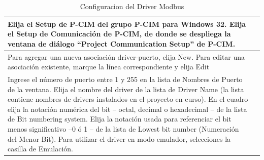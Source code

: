 \begin{itemize}
\begin{table}[H]
\centering
\renewcommand*{\arraystretch}{0.3}
\begin{tabular}{*{2}{m{}}}
\hline
  Elija el Setup de P-CIM del grupo P-CIM para Windows 32.
  Elija el Setup de Comunicación de P-CIM, de donde se despliega la ventana 
  de diálogo “Project Communication Setup” de P-CIM.
  &\begin{center}
    \rule{0.4\textwidth}{0.3\textwidth}
  \end{center}\\
\hline
  Para agregar una nueva asociación driver-puerto, elija New.
  Para editar una asociación existente, marque la línea correspondiente
  y elija Edit
  &\begin{center}
    \rule{0.4\textwidth}{0.3\textwidth}
  \end{center}\\
\hline
  Ingrese el número de puerto entre 1 y 255 en la lista de Nombres de 
  Puerto de la ventana.
  Elija el nombre del driver de la lista de Driver Name (la lista 
  contiene nombres de drivers instalados en el proyecto en curso).
  En el cuadro elija la notación numérica del bit – octal, decimal o 
  hexadecimal – de la lista de Bit numbering system.
  Elija la notación usada para referenciar el bit menos significativo –0 
   ó 1 – de la lista de Lowest bit number (Numeración del Menor Bit).
  Para utilizar el driver en modo emulador, selecciones la casilla de 
  Emulación.
  &\begin{center}
    \rule{0.4\textwidth}{0.3\textwidth}
  \end{center}\\
\hline
\end{tabular}
\label{tab:ConfigModbus}
\caption{Configuracion del Driver Modbus}
\end{table}
 
 
 

\end{itemize}
